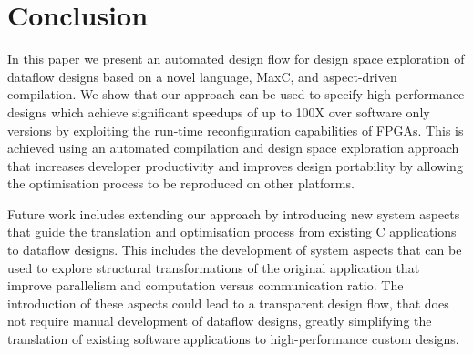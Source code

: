 \section{Conclusion}

In this paper we present an automated design flow for design space
exploration of dataflow designs based on a novel language, MaxC, and
aspect-driven compilation. We show that our approach can be used to
specify high-performance designs which achieve significant speedups of
up to 100X over software only versions by exploiting the run-time
reconfiguration capabilities of FPGAs. This is achieved using an
automated compilation and design space exploration approach that
increases developer productivity and improves design portability by
allowing the optimisation process to be reproduced on other platforms.

Future work includes extending our approach by introducing new system
aspects that guide the translation and optimisation process from
existing C applications to dataflow designs. This includes the
development of system aspects that can be used to explore structural
transformations of the original application that improve parallelism
and computation versus communication ratio. The introduction of these
aspects could lead to a transparent design flow, that does not require
manual development of dataflow designs, greatly simplifying the
translation of existing software applications to high-performance
custom designs.
